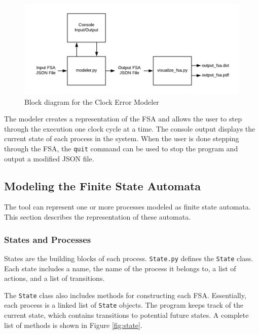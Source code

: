 \documentclass[12pt]{extarticle}
\begin{document}
\begin{figure}[!htbp]
  \begin{center}
  \includegraphics[width=400pt]{./block_diagram.png}
  \end{center}
  \caption{Block diagram for the Clock Error Modeler}
  \label{fig:block}
\end{figure}

The modeler creates a representation of the FSA and allows the user to step through the execution one clock cycle at a time. The console output displays the current state of each process in the system. When the user is done stepping through the FSA, the \verb|quit| command can be used to stop the program and output a modified JSON file.

\subsection{Modeling the Finite State Automata}
The tool can represent one or more processes modeled as finite state automata. This section describes the representation of these automata.
\subsubsection{States and Processes}
States are the building blocks of each process. \verb|State.py| defines the \verb|State| class. Each state includes a name, the name of the process it belongs to, a list of actions, and a list of transitions.

The \verb|State| class also includes methods for constructing each FSA. Essentially, each process is a linked list of \verb|State| objects. The program keeps track of the current state, which contains transitions to potential future states. A complete list of methods is shown in Figure \ref{fig:state}.
\end{document}
